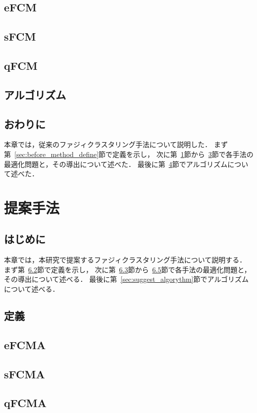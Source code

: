 \documentclass[a4j,12pt,dvipdfmx,oneside]{jsbook}
\theoremstyle{definition}
\begin{document}
\section{eFCM}\label{sec:efcm}
%
\section{sFCM}\label{sec:sfcm}
%
\section{qFCM}\label{sec:qfcm}
%
\section{アルゴリズム}\label{sec:before_algorythm}
%
\section{おわりに}\label{sec:before_method_summary}
本章では，従来のファジィクラスタリング手法について説明した．
まず第~\ref{sec:before_method_define}節で定義を示し，
次に第~\ref{sec:efcm}節から~\ref{sec:qfcm}節で各手法の最適化問題と，その導出について述べた．
最後に第~\ref{sec:before_algorythm}節でアルゴリズムについて述べた．
%
%
%
\chapter{提案手法}\label{chap:suggest_method}
%
\section{はじめに}\label{sec:suggest_method_intro}
本章では，本研究で提案するファジィクラスタリング手法について説明する．
まず第~\ref{sec:suggest_method_define}節で定義を示し，
次に第~\ref{sec:efcma}節から~\ref{sec:qfcma}節で各手法の最適化問題と，その導出について述べる．
最後に第~\ref{sec:suggest_algorythm}節でアルゴリズムについて述べる．
%
\section{定義}\label{sec:suggest_method_define}
%
\section{eFCMA}\label{sec:efcma}
%
\section{sFCMA}\label{sec:sfcma}
%
\section{qFCMA}\label{sec:qfcma}
%
\end{document}
